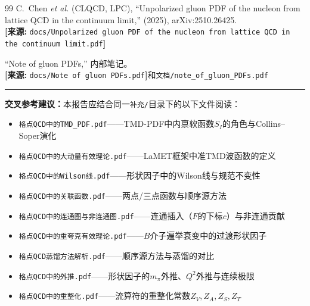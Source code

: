 \documentclass[12pt,a4paper]{ctexart}
\theoremstyle{definition}
\begin{document}
\begin{thebibliography}{99}
C.~Chen \textit{et al.} (CLQCD, LPC),
``Unpolarized gluon PDF of the nucleon from lattice QCD in the continuum limit,''
(2025), arXiv:2510.26425.
\\\textbf{[来源:} \texttt{docs/Unpolarized gluon PDF of the nucleon from lattice QCD in the continuum limit.pdf}\textbf{]}

``Note of gluon PDFs,'' 内部笔记。
\\\textbf{[来源:} \texttt{docs/Note of gluon PDFs.pdf}\textbf{]}和\texttt{文档/note\_of\_gluon\_PDFs.pdf}

\end{thebibliography}

\vspace{0.5cm}
\noindent\rule{\textwidth}{0.5pt}
\small
\textbf{交叉参考建议：}本报告应结合同一\texttt{补充/}目录下的以下文件阅读：
\begin{itemize}[nosep]
    \item \texttt{格点QCD中的TMD\_PDF.pdf}——TMD-PDF中内禀软函数$S_I$的角色与Collins--Soper演化
    \item \texttt{格点QCD中的大动量有效理论.pdf}——LaMET框架中准TMD波函数的定义
    \item \texttt{格点QCD中的Wilson线.pdf}——形状因子中的Wilson线与规范不变性
    \item \texttt{格点QCD中的关联函数.pdf}——两点/三点函数与顺序源方法
    \item \texttt{格点QCD中的连通图与非连通图.pdf}——连通插入（$F$的下标$c$）与非连通贡献
    \item \texttt{格点QCD中的重夸克有效理论.pdf}——$B$介子遍举衰变中的过渡形状因子
    \item \texttt{格点QCD蒸馏方法解析.pdf}——顺序源方法与蒸馏的对比
    \item \texttt{格点QCD中的外推.pdf}——形状因子的$m_\pi$外推、$Q^2$外推与连续极限
    \item \texttt{格点QCD中的重整化.pdf}——流算符的重整化常数$Z_V, Z_A, Z_S, Z_T$
\end{itemize}
\end{document}
